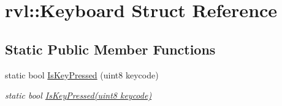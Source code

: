 \hypertarget{structrvl_1_1_keyboard}{}\section{rvl\+:\+:Keyboard Struct Reference}
\label{structrvl_1_1_keyboard}
\subsection*{Static Public Member Functions}
\begin{DoxyCompactItemize}
\item 
static bool \hyperlink{structrvl_1_1_keyboard_aad30f3f55bf55d1280d11aa69032b59c}{Is\+Key\+Pressed} (uint8 keycode)
\begin{DoxyCompactList}\small\item\em static bool \hyperlink{structrvl_1_1_keyboard_aad30f3f55bf55d1280d11aa69032b59c}{Is\+Key\+Pressed(uint8 keycode)} \end{DoxyCompactList}\end{DoxyCompactItemize}

